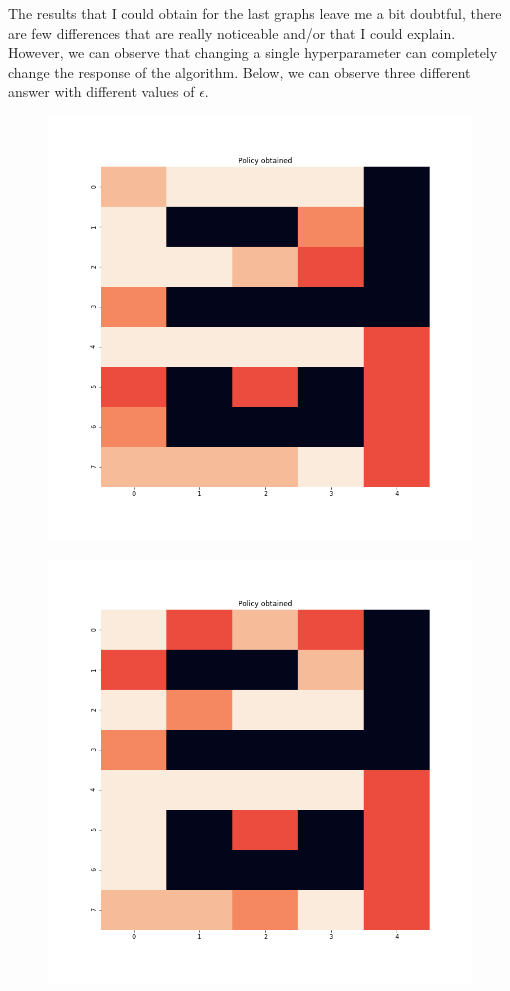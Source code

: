 \documentclass[11pt]{article}
\begin{document}
\begin{multicols}{2}
The results that I could obtain for the last graphs leave me a bit doubtful, there are few differences that are really noticeable and/or that I could explain. However, we can observe that changing a single hyperparameter can completely change the response of the algorithm. Below, we can observe three different answer with different values of $\epsilon$.

\begin{figure}[H]
\centering
\includegraphics[scale = 0.3]{Policy_ql_eps7.png}
\end{figure}

\begin{figure}[H]
\centering
\includegraphics[scale = 0.3]{Policy_ql_eps4.png}
\end{figure}


\end{multicols}
\end{document}
